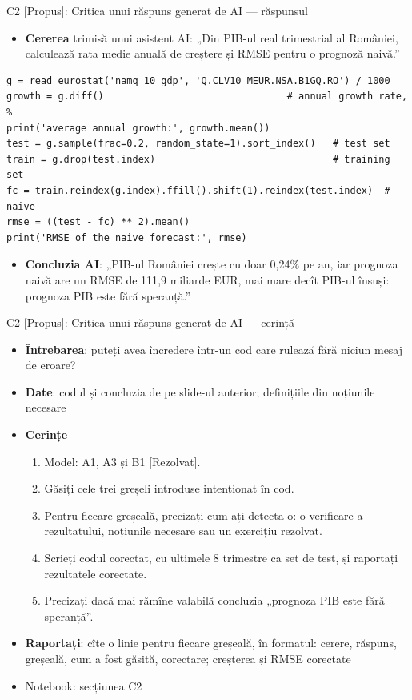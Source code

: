 \begin{frame}[fragile]{C2 [Propus]: Critica unui răspuns generat de AI --- răspunsul}
\itemsize{\footnotesize}
\begin{itemize}
    \item \textbf{Cererea} trimisă unui asistent AI: „Din PIB-ul real trimestrial al României, calculează rata medie anuală de creștere și RMSE pentru o prognoză naivă.”
\end{itemize}
\begin{lstlisting}
g = read_eurostat('namq_10_gdp', 'Q.CLV10_MEUR.NSA.B1GQ.RO') / 1000
growth = g.diff()                                # annual growth rate, %
print('average annual growth:', growth.mean())
test = g.sample(frac=0.2, random_state=1).sort_index()   # test set
train = g.drop(test.index)                               # training set
fc = train.reindex(g.index).ffill().shift(1).reindex(test.index)  # naive
rmse = ((test - fc) ** 2).mean()
print('RMSE of the naive forecast:', rmse)
\end{lstlisting}
\begin{itemize}
    \item \textbf{Concluzia AI}: „PIB-ul României crește cu doar 0{,}24\% pe an, iar prognoza naivă are un RMSE de 111{,}9 miliarde EUR, mai mare decît PIB-ul însuși: prognoza PIB este fără speranță.”
\end{itemize}
\end{frame}

\begin{frame}{C2 [Propus]: Critica unui răspuns generat de AI --- cerință}
\itemsize{\small}
\begin{itemize}
\item \textbf{Întrebarea}: puteți avea încredere într-un cod care rulează fără niciun mesaj de eroare?
\item \textbf{Date}: codul și concluzia de pe slide-ul anterior; definițiile din noțiunile necesare
\item \textbf{Cerințe}
\begin{enumerate}
    \item Model: A1, A3 și B1 [Rezolvat].
    \item Găsiți cele trei greșeli introduse intenționat în cod.
    \item Pentru fiecare greșeală, precizați cum ați detecta-o: o verificare a rezultatului, noțiunile necesare sau un exercițiu rezolvat.
    \item Scrieți codul corectat, cu ultimele 8 trimestre ca set de test, și raportați rezultatele corectate.
    \item Precizați dacă mai rămîne valabilă concluzia „prognoza PIB este fără speranță”.
\end{enumerate}
\item \textbf{Raportați}: cîte o linie pentru fiecare greșeală, în formatul: cerere, răspuns, greșeală, cum a fost găsită, corectare; creșterea și RMSE corectate
\item Notebook: secțiunea C2
\end{itemize}
\end{frame}

